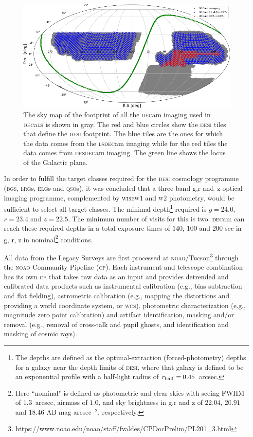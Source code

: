 \documentclass[fleqn,usenatbib]{mnras}
\newcommand{\BGS}{\textsc{bgs}\xspace}
\newcommand{\CP}{\textsc{cp}\xspace}
\newcommand{\DECam}{\textsc{dec}am\xspace}
\newcommand{\DECaLS}{\textsc{dec}a\textsc{ls}\xspace}
\newcommand{\DESI}{\textsc{desi}\xspace}
\newcommand{\DES}{\textsc{des}\xspace}
\newcommand{\ELGs}{\textsc{elg}s\xspace}
\newcommand{\LRGs}{\textsc{lrg}s\xspace}
\newcommand{\LS}{\textsc{ls}\xspace}
\newcommand{\NOAO}{\textsc{noao}\xspace}
\newcommand{\QSOs}{\textsc{qso}s\xspace}
\newcommand{\WCS}{\textsc{wcs}\xspace}
\newcommand{\WISE}{\textsc{wise}\xspace}
\newcommand{\Wone}{\textsc{w1}\xspace}
\newcommand{\Wtwo}{\textsc{w2}\xspace}
\begin{document}
\begin{figure}
	\includegraphics[width=\columnwidth]{images/decals_in_desi_footprint}
    \caption{The sky map of the footprint of all the \DECam imaging used in \DECaLS is shown in gray. The red and blue circles show the \DESI tiles that define the \DESI footprint.
    The blue tiles are the ones for which the data comes from the \LS \DECam imaging while for the red tiles the data comes from \DES \DECam imaging. The green line shows the locus of the Galactic plane.}
    \label{fig:decals_in_desi}
\end{figure}


In order to fulfill the target classes required for the \DESI cosmology programme (\BGS, \LRGs, \ELGs and \QSOs), it was concluded that a three-band g,r and~z optical imaging programme, complemented by \WISE \Wone and \Wtwo photometry, would be sufficient to select all target classes. The minimal  depth\footnote{The depths are defined as the optimal-extraction (forced-photometry) depths for a galaxy near the depth limits of \DESI, where that galaxy is defined to be an exponential profile with a half-light radius of $r_{\rm half}= 0.45$~arcsec.} required is $g=24.0$,$r=23.4$ and $z=22.5$. The minimum number of visits for this is two. \DECam can reach these required depths in a total exposure times of $140$, $100$ and $200$ sec in g, r, z in nominal\footnote{Here ``nominal" is defined as photometric and clear skies with seeing FWHM of $1.3$~arcsec, airmass of $1.0$, and sky brightness 
in g,r and z of $22.04$, $20.91$ and $18.46$ AB mag arcsec$^{-2}$, respectively.} conditions.




All data from the Legacy Surveys are first processed at \NOAO/Tucson\footnote{https://www.noao.edu/noao/staff/fvaldes/CPDocPrelim/PL201\_3.html} through the \NOAO Community Pipeline (\CP). Each instrument and telescope combination has its own \CP that takes raw data as an input and provides detrended and calibrated data products such as instrumental calibration (e.g., bias subtraction and flat fielding), astrometric calibration (e.g., mapping the distortions and providing a world coordinate system, or \WCS), photometric characterization (e.g., magnitude zero point calibration) and artifact identification, masking and/or removal (e.g., removal of cross-talk and pupil ghosts, and identification and masking of cosmic rays). 
\end{document}
